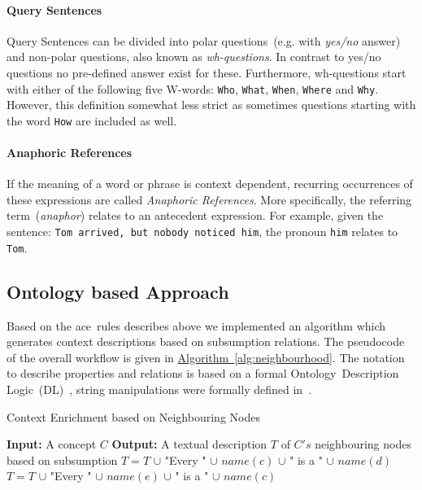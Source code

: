 \paragraph{Query Sentences} Query Sentences can be divided into polar questions~(e.g. with \textit{yes/no} answer) and non-polar questions, also known as \emph{wh-questions}. In contrast to yes/no questions no pre-defined answer exist for these. Furthermore, wh-questions start with either of the following five W-words: \texttt{Who}, \texttt{What}, \texttt{When}, \texttt{Where} and \texttt{Why}. However, this definition somewhat less strict as sometimes questions starting with the word \texttt{How} are included as well.

\paragraph{Anaphoric References} If the meaning of a word or phrase is context dependent, recurring occurrences of these expressions are called \textit{Anaphoric References}. More specifically, the referring term~(\textit{anaphor}) relates to an antecedent expression. For example, given the sentence: \texttt{Tom arrived, but nobody noticed him}, the pronoun \texttt{him} relates to \texttt{Tom}. 

\subsection{Ontology based Approach}\label{sec:enrichment_ontology_approach}
Based on the \gls{ace}~rules describes above we implemented an algorithm which generates context descriptions based on subsumption relations. The pseudocode of the overall workflow is given in \hyperref[alg:neighbourhood]{Algorithm~\ref*{alg:neighbourhood}}. The notation to describe properties and relations is based on a formal Ontology~Description Logic~(DL)~\cite{baader2003}, string manipulations were formally defined in~\cite{hopcroft1969}.

\begin{algorithm}
	\caption{Context Enrichment based on Neighbouring Nodes}\label{alg:neighbourhood}
	\begin{algorithmic}[1]
		\newline
			\textbf{Input:} A concept $C$\newline
			\textbf{Output:} A textual description $T$ of $C's$ neighbouring nodes based on subsumption\newline
			 \label{alg:neighbourhood:text_initialisation}
				\State $T=T$ $\cup$ "Every " $\cup$ $name(c)$ $\cup$ " is a " $\cup$ $name(d)$
			\EndFor
				\State $T=T$ $\cup$ "Every " $\cup$ $name(e)$ $\cup$ " is a " $\cup$ $name(c)$
			\EndFor
		\EndProcedure
	\end{algorithmic}
\end{algorithm}

